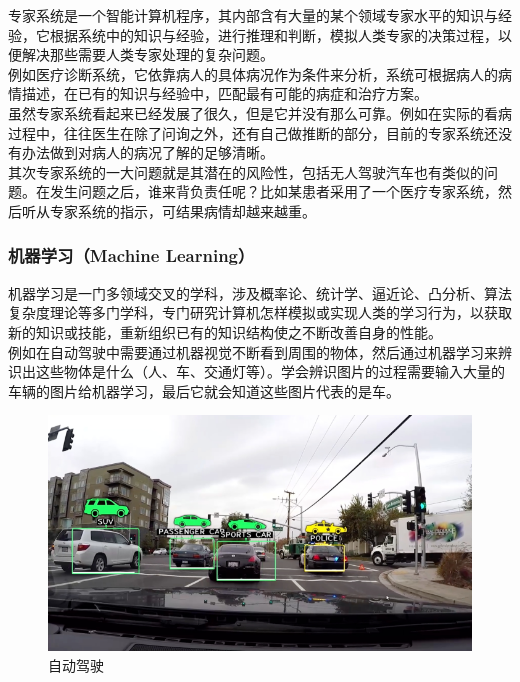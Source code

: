 专家系统是一个智能计算机程序，其内部含有大量的某个领域专家水平的知识与经验，它根据系统中的知识与经验，进行推理和判断，模拟人类专家的决策过程，以便解决那些需要人类专家处理的复杂问题。\\

例如医疗诊断系统，它依靠病人的具体病况作为条件来分析，系统可根据病人的病情描述，在已有的知识与经验中，匹配最有可能的病症和治疗方案。\\

虽然专家系统看起来已经发展了很久，但是它并没有那么可靠。例如在实际的看病过程中，往往医生在除了问询之外，还有自己做推断的部分，目前的专家系统还没有办法做到对病人的病况了解的足够清晰。\\

其次专家系统的一大问题就是其潜在的风险性，包括无人驾驶汽车也有类似的问题。在发生问题之后，谁来背负责任呢？比如某患者采用了一个医疗专家系统，然后听从专家系统的指示，可结果病情却越来越重。\\

\subsubsection{机器学习（Machine Learning）}

机器学习是一门多领域交叉的学科，涉及概率论、统计学、逼近论、凸分析、算法复杂度理论等多门学科，专门研究计算机怎样模拟或实现人类的学习行为，以获取新的知识或技能，重新组织已有的知识结构使之不断改善自身的性能。\\

例如在自动驾驶中需要通过机器视觉不断看到周围的物体，然后通过机器学习来辨识出这些物体是什么（人、车、交通灯等）。学会辨识图片的过程需要输入大量的车辆的图片给机器学习，最后它就会知道这些图片代表的是车。

\begin{figure}[H]
    \centering
    \includegraphics{img/Chapter1/1-1/1.png}
    \caption{自动驾驶}
\end{figure}

